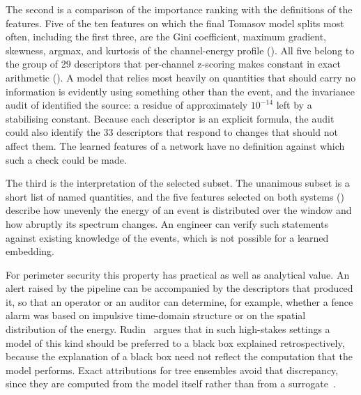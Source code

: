 The second is a comparison of the importance ranking with the definitions of the features. Five of the ten features on which the final Tomasov model splits most often, including the first three, are the Gini coefficient, maximum gradient, skewness, argmax, and kurtosis of the channel-energy profile (). All five belong to the group of 29 descriptors that per-channel z-scoring makes constant in exact arithmetic (). A model that relies most heavily on quantities that should carry no information is evidently using something other than the event, and the invariance audit of  identified the source: a residue of approximately $10^{-14}$ left by a stabilising constant. Because each descriptor is an explicit formula, the audit could also identify the 33 descriptors that respond to changes that should not affect them. The learned features of a network have no definition against which such a check could be made.

The third is the interpretation of the selected subset. The unanimous subset is a short list of named quantities, and the five features selected on both systems () describe how unevenly the energy of an event is distributed over the window and how abruptly its spectrum changes. An engineer can verify such statements against existing knowledge of the events, which is not possible for a learned embedding.

For perimeter security this property has practical as well as analytical value. An alert raised by the pipeline can be accompanied by the descriptors that produced it, so that an operator or an auditor can determine, for example, whether a fence alarm was based on impulsive time-domain structure or on the spatial distribution of the energy. Rudin~\cite{rudin2019stop} argues that in such high-stakes settings a model of this kind should be preferred to a black box explained retrospectively, because the explanation of a black box need not reflect the computation that the model performs. Exact attributions for tree ensembles avoid that discrepancy, since they are computed from the model itself rather than from a surrogate~\cite{lundberg2020trees}.


